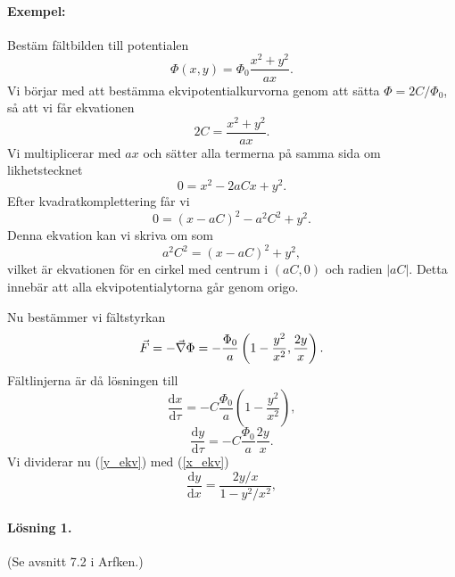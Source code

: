 \documentclass[%
oneside,                 %
final,                   %
10pt]{article}
\begin{document}
\paragraph{Exempel:}
Bestäm fältbilden till potentialen
\begin{equation}
  \Phi\left(x,y\right) = \Phi_0 \frac{x^2 + y^2}{ax}.
\end{equation}
Vi börjar med att bestämma ekvipotentialkurvorna genom att sätta $\Phi = 2C/\Phi_0$, så att vi får ekvationen
\begin{equation}
  2C = \frac{x^2+y^2}{ax}.
\end{equation}
Vi multiplicerar med $ax$ och sätter alla termerna på samma sida om likhetstecknet
\begin{equation}
  0 = x^2 -2aCx +y^2.
\end{equation}
Efter kvadratkomplettering får vi
\begin{equation}
  0 = \left(x - aC\right)^2 -a^2 C^2 + y^2.
\end{equation}
Denna ekvation kan vi skriva om som
\begin{equation}
  a^2 C^2 = \left(x - aC\right)^2 + y^2,
\end{equation}
vilket är ekvationen för en cirkel med centrum i $(aC,0)$ och radien $|aC|$.  Detta innebär att alla ekvipotentialytorna går genom origo.

Nu bestämmer vi fältstyrkan
\begin{equation}
  \vec{F} = - \vec{\nabla} \Phi = - \frac{\Phi_0}{a} \left(1 - \frac{y^2}{x^2},
\frac{2y}{x}\right).
\end{equation}
Fältlinjerna är då lösningen till 
\begin{equation}
  \frac{\mbox{d}x}{\mbox{d}\tau} = -C \frac{\Phi_0}{a}\left(1 - \frac{y^2}{x^2}
\right),
\label{x_ekv}
\end{equation}
\begin{equation}
  \frac{\mbox{d}y}{\mbox{d}\tau} = -C \frac{\Phi_0}{a} \frac{2y}{x}.
\label{y_ekv}
\end{equation}
Vi dividerar nu (\ref{y_ekv}) med (\ref{x_ekv})
\begin{equation}
\label{diffekv}
  \frac{\mbox{d}y}{\mbox{d}x} = \frac{2y/x}{1-y^2/x^2},
\end{equation}
\paragraph{Lösning 1.}
(Se avsnitt 7.2 i Arfken.)
\end{document}
